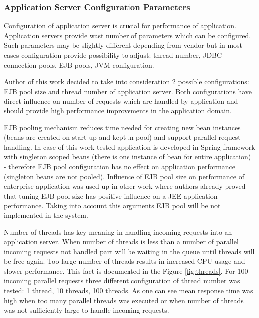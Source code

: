 \documentclass[12pt,a4paper]{article}
\begin{document}
\subsubsection{Application Server Configuration Parameters}

Configuration of application server is crucial for performance of application. Application servers provide wast number of parameters which can be configured. Such parameters may be slightly different depending from vendor but in most cases configuration provide possibility to adjust: thread number, JDBC connection pools, EJB pools, JVM configuration. 

Author of this work decided to take into consideration 2 possible configurations: EJB pool size and thread number of application server. Both configurations have direct influence on number of requests which are handled by application and should provide high performance improvements in the application domain. 

EJB pooling mechanism reduces time needed for creating new bean instances (beans are created on start up and kept in pool) and support parallel request handling. In case of this work tested application is developed in Spring framework with singleton scoped beans (there is one instance of bean for entire application) - therefore EJB pool configuration has no effect on application performance (singleton beans are not pooled). Influence of EJB pool size on performance of enterprise application was used up in other work \cite{autotuning} where authors already proved that tuning EJB pool size has positive influence on a JEE application performance. Taking into account this arguments EJB pool will be not implemented in the system. 

Number of threads has key meaning in handling incoming requests into an application server. When number of threads is less than a number of parallel incoming requests not handled part will be waiting in the queue until threads will be free again. Too large number of threads results in increased CPU usage and slower performance. This fact is documented in the Figure \ref{fig:threads}. For 100 incoming parallel requests three different configuration of thread number was tested: 1 thread, 10 threads, 100 threads. As one can see mean response time was high when too many parallel threads was executed or when number of threads was not sufficiently large to handle incoming requests.    
\end{document}

